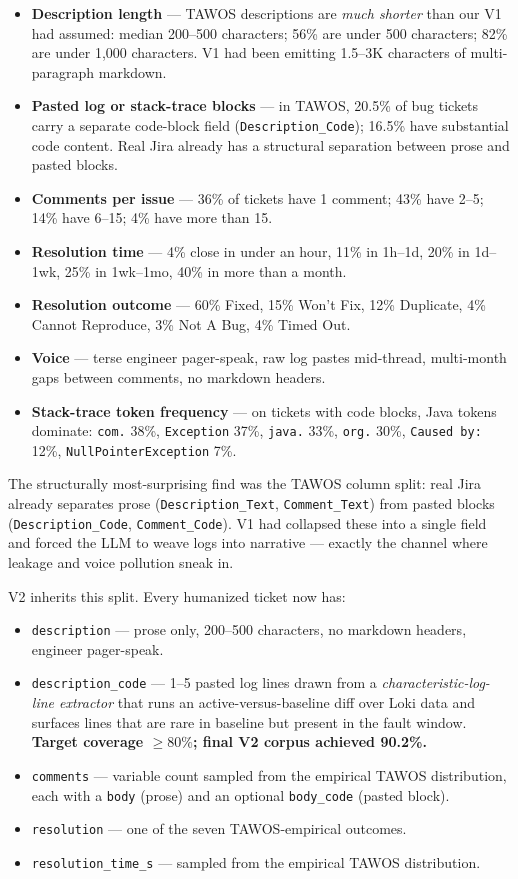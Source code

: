 \begin{itemize}
\item \textbf{Description length} --- TAWOS descriptions are \emph{much shorter} than our V1 had assumed: median 200--500 characters; 56\% are under 500 characters; 82\% are under 1{,}000 characters. V1 had been emitting 1.5--3K characters of multi-paragraph markdown.
\item \textbf{Pasted log or stack-trace blocks} --- in TAWOS, 20.5\% of bug tickets carry a separate code-block field (\texttt{Description\_Code}); 16.5\% have substantial code content. Real Jira already has a structural separation between prose and pasted blocks.
\item \textbf{Comments per issue} --- 36\% of tickets have 1 comment; 43\% have 2--5; 14\% have 6--15; 4\% have more than 15.
\item \textbf{Resolution time} --- 4\% close in under an hour, 11\% in 1h--1d, 20\% in 1d--1wk, 25\% in 1wk--1mo, 40\% in more than a month.
\item \textbf{Resolution outcome} --- 60\% Fixed, 15\% Won't Fix, 12\% Duplicate, 4\% Cannot Reproduce, 3\% Not A Bug, 4\% Timed Out.
\item \textbf{Voice} --- terse engineer pager-speak, raw log pastes mid-thread, multi-month gaps between comments, no markdown headers.
\item \textbf{Stack-trace token frequency} --- on tickets with code blocks, Java tokens dominate: \texttt{com.} 38\%, \texttt{Exception} 37\%, \texttt{java.} 33\%, \texttt{org.} 30\%, \texttt{Caused by:} 12\%, \texttt{NullPointerException} 7\%.
\end{itemize}

The structurally most-surprising find was the TAWOS column split: real Jira already separates prose (\texttt{Description\_Text}, \texttt{Comment\_Text}) from pasted blocks (\texttt{Description\_Code}, \texttt{Comment\_Code}). V1 had collapsed these into a single field and forced the LLM to weave logs into narrative --- exactly the channel where leakage and voice pollution sneak in.

V2 inherits this split. Every humanized ticket now has:

\begin{itemize}
\item \texttt{description} --- prose only, 200--500 characters, no markdown headers, engineer pager-speak.
\item \texttt{description\_code} --- 1--5 pasted log lines drawn from a \emph{characteristic-log-line extractor} that runs an active-versus-baseline diff over Loki data and surfaces lines that are rare in baseline but present in the fault window. \textbf{Target coverage $\geq 80\%$; final V2 corpus achieved 90.2\%.}
\item \texttt{comments} --- variable count sampled from the empirical TAWOS distribution, each with a \texttt{body} (prose) and an optional \texttt{body\_code} (pasted block).
\item \texttt{resolution} --- one of the seven TAWOS-empirical outcomes.
\item \texttt{resolution\_time\_s} --- sampled from the empirical TAWOS distribution.
\end{itemize}


